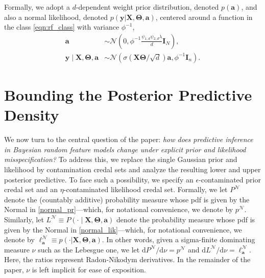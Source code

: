 \documentclass[12pt, english, oneside, a4paper]{article}
\newcommand{\y}{\boldsymbol{y}}
\newcommand{\X}{\boldsymbol{X}}
\renewcommand{\a}{\boldsymbol{a}}
\newcommand{\bT}{\boldsymbol{\Theta}}
\begin{document}
Formally, we adopt a $d$-dependent weight prior distribution, denoted $p(\a)$, and also a normal likelihood, denoted $p(\y|\X,\bT,\a)$, centered around a function in the class \eqref{eqn:rf_class} with variance $\phi^{-1}$,
\begin{align}
    \a &\sim \mathcal{N}\left(0,\phi^{-1}\frac{\psi_{1,d}\psi_{2,d}\lambda}{d}\mathbf{I}_N\right), \label{normal_pr}\\
    \y \mid \X,\bT,\a &\sim \mathcal{N}\left(\sigma(\X\bT/\sqrt{d})\a,\phi^{-1}\mathbf{I}_n\right). \label{normal_lik}
\end{align}




\section{Bounding the Posterior Predictive Density}\label{sec:main}


We now turn to the central question of the paper: \emph{how does predictive inference in Bayesian random feature models change under explicit prior and likelihood misspecification?} To address this, we replace the single Gaussian prior and likelihood by contamination credal sets and analyze the resulting lower and upper posterior predictive.
To face such a possibility, we specify an $\epsilon$-contaminated prior credal set 
and an $\eta$-contaminated likelihood credal set. Formally, we let $P^\mathcal{N}$ denote the (countably additive) probability measure whose pdf is given by the Normal in \eqref{normal_pr}---which, for notational convenience, we denote by $p^\mathcal{N}$. Similarly, let $L^\mathcal{N} \equiv P(\cdot \mid \X,\bT,\a)$ denote the probability measure whose pdf is given by the Normal in \eqref{normal_lik}---which, for notational convenience, we denote by $\ell_{\a}^\mathcal{N} \equiv p(\cdot|\X,\bT,\a)$. In other words, given a sigma-finite dominating measure $\nu$ such as the Lebesgue one, we let $\text{d}P^\mathcal{N}/\text{d}\nu=p^\mathcal{N}$ and $\text{d}L^\mathcal{N}/\text{d}\nu=\ell_{\a}^\mathcal{N}$. Here, the ratios represent Radon-Nikodym derivatives. In the remainder of the paper, $\nu$ is left implicit for ease of exposition.
\end{document}
